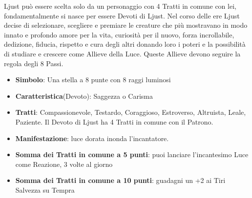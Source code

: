 \begin{multicols}{2}
Ljust può essere scelta solo da un personaggio con 4 Tratti in comune con lei, fondamentalmente si nasce per essere Devoti di Ljust. Nel corso delle ere Ljust decise di selezionare, scegliere e premiare le creature che più mostravano in modo innato e profondo amore per la vita, curiosità per il nuovo, forza incrollabile, dedizione, fiducia, rispetto e cura degli altri donando loro i poteri e la possibilità di studiare e crescere come Allieve della Luce. Queste Allieve devono seguire la regola degli 8 Passi.


\begin{itemize}[leftmargin=*] \setlength{\itemsep}{0pt}
\item \textbf{Simbolo}: Una stella a 8 punte con 8 raggi luminosi
\item \textbf{Caratteristica}(Devoto): Saggezza o Carisma
\item \textbf{Tratti}: Compassionevole, Testardo, Coraggioso, Estroverso, Altruista, Leale, Paziente. Il Devoto di Ljust ha 4 Tratti in comune con il Patrono.
\item \textbf{Manifestazione}: luce dorata inonda l'incantatore.
\item \textbf{Somma dei Tratti in comune a 5 punti}: puoi lanciare l'incantesimo Luce come Reazione, 3 volte al giorno
\item \textbf{Somma dei Tratti in comune a 10 punti}: guadagni un +2 ai Tiri Salvezza su Tempra


\end{itemize}
\end{multicols}
